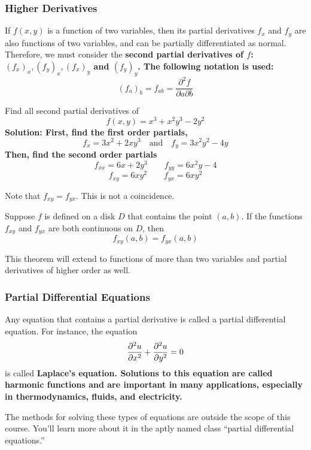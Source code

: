 \subsubsection{Higher Derivatives}
If \(f(x,y)\) is a function of two variables, then its partial derivatives \(f_x\) and \(f_y\) are also functions of two variables, and can be partially differentiated as normal. Therefore, we must consider the \bf{second partial derivatives} of \(f\): \((f_x)_x, (f_y)_x, (f_x)_y\) and \((f_y)_y\). The following notation is used:
\[ (f_a)_b = f_{ab} = \frac{\partial^2f}{\partial a \partial b}\]
\begin{example}
    Find all second partial derivatives of 
    \[ f(x,y) = x^3+x^2y^3-2y^2 \]
    \bf{Solution: }First, find the first order partials,
    \[ f_x = 3x^2+2xy^3\quad\text{and}\quad f_y=3x^2y^2-4y \]
    Then, find the second order partials
    \[ f_{xx} = 6x+2y^3\quad\quad f_{yy} = 6x^2y - 4\]
    \[ f_{xy} = 6xy^2\quad\quad f_{yx} = 6xy^2 \]
\end{example}
Note that \(f_{xy}=f_{yx}\). This is not a coincidence.
\begin{theorem}
    Suppose \(f\) is defined on a disk \(D\) that contains the point \((a,b)\). If the functions \(f_{xy}\) and \(f_{yx}\) are both continuous on \(D\), then
    \[ f_{xy}(a,b) = f_{yx}(a,b)\]
\end{theorem}
This theorem will extend to functions of more than two variables and partial derivatives of higher order as well.
\subsubsection{Partial Differential Equations}
Any equation that contains a partial derivative is called a partial differential equation. For instance, the equation 
\[ \pdv[2]{u}{x} + \pdv[2]{u}{y}=0\]
is called \bf{Laplace's equation}. Solutions to this equation are called \bf{harmonic functions} and are important in many applications, especially in thermodynamics, fluids, and electricity.\par The methods for solving these types of equations are outside the scope of this course. You'll learn more about it in the aptly named class ``partial differential equations.''
